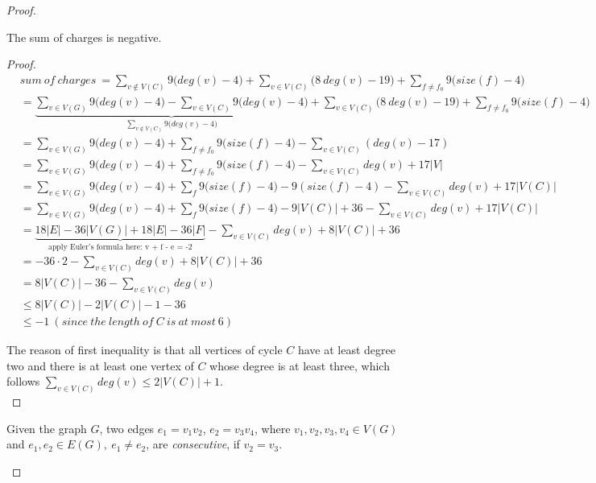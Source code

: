 \begin{proof}
\begin{claim}
The sum of charges is negative.
\end{claim}
\begin{proof}
\begin{align*}
    & sum \ of \ charges \ = \sum_{v \notin V(C)}9\big(deg(v) - 4\big) + \sum_{v \in V(C)} \big(8 \ deg(v) - 19\big) + \sum_{f \neq f_0}9\big(size(f) - 4\big) \\
    &= \underbrace{\sum_{v \in V(G)}9\big(deg(v) - 4\big) - \sum_{v \in V(C)}9\big(deg(v) - 4\big)}_{\sum_{v \notin V(C)}9\big(deg(v) - 4\big)} + \sum_{v \in V(C)} \big(8 \ deg(v) - 19\big) + \sum_{f \neq f_0}9\big(size(f) - 4\big) \\
    &= \sum_{v \in V(G)}9\big(deg(v) - 4\big) + \sum_{f \neq f_0}9\big(size(f) - 4\big) - \sum_{v \in V(C)}(deg(v) - 17)\\
    &= \sum_{v \in V(G)}9\big(deg(v) - 4\big) + \sum_{f \neq f_0}9\big(size(f) - 4\big) - \sum_{v \in V(C)}deg(v) + 17\left| V \right|\\
    &= \sum_{v \in V(G)}9\big(deg(v) - 4\big) + \sum_{f}9\big(size(f) - 4\big) - 9(size(f) - 4) - \sum_{v \in V(C)}deg(v) + 17\left| V(C) \right|\\
    &= \sum_{v \in V(G)}9\big(deg(v) - 4\big) + \sum_{f}9\big(size(f) - 4\big) - 9 \left| V(C) \right| + 36 - \sum_{v \in V(C)}deg(v) + 17\left| V(C) \right|\\
    &= \underbrace{18 \left| E \right| - 36\left| V(G) \right| + 18 \left| E \right| - 36 \left| F \right|}_{\text{apply Euler's formula here: v + f - e = -2}} - \sum_{v \in V(C)}deg(v) + 8 \left| V(C) \right| + 36 \\
    &= -36 \cdot 2 - \sum_{v \in V(C)}deg(v) + 8 \left| V(C) \right| + 36\\
    &= 8 \left| V(C) \right| - 36 - \sum_{v \in V(C)}deg(v)\\
    &\leq 8 \left| V(C) \right|- 2 \left| V(C) \right| - 1 - 36 \\
    &\leq -1 \ (since \ the \ length \ of \ C \ is \ at \ most \ 6)
\end{align*}

The reason of first inequality is that all vertices of cycle $C$ have at least degree two and there is at least one vertex of $C$ whose degree is at least three, which follows $\sum_{v \in V(C)}deg(v) \leq 2\left| V(C) \right| + 1$. \\
\end{proof}

\begin{definition}
Given the graph $G$, two edges $e_1 = v_1v_2$, $e_2 = v_3v_4$, where $v_1, v_2, v_3, v_4 \in V(G)$ and $e_1, e_2 \in E(G), \ e_1 \ne e_2$, are \textit{consecutive}, if $v_2 = v_3$.
\end{definition}


\end{proof}
